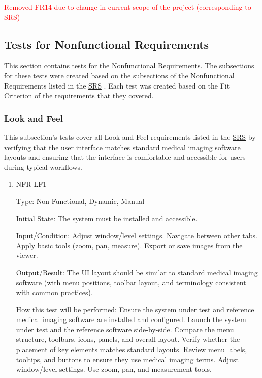 \documentclass[12pt, titlepage]{article}
\begin{document}
\begin{enumerate}
\begin{enumerate}
\begin{enumerate}
\textcolor{red}{Removed FR14 due to change in current scope of the project (corresponding to SRS)}

\subsection{Tests for Nonfunctional Requirements}

This section contains tests for the Nonfunctional Requirements. The subsections for these tests were created based on the subsections of the Nonfunctional Requirements listed in the \href{https://github.com/RezaJodeiri/CXR-Capstone/blob/main/docs/SRS/SRS.pdf}{SRS} \citep{SRS}
. Each test was created based on the Fit Criterion of the requirements that they covered.

\subsubsection{Look and Feel}

This subsection's tests cover all Look and Feel requirements listed in the \href{https://github.com/RezaJodeiri/CXR-Capstone/blob/main/docs/SRS/SRS.pdf}{SRS} \citep{SRS}
 by verifying that the user interface matches standard medical imaging software layouts and ensuring that the interface is comfortable and accessible for users during typical workflows.

\begin{enumerate}

\item{NFR-LF1\\}\label{NFR-LF1}

Type: Non-Functional, Dynamic, Manual

Initial State: The system must be installed and accessible.

Input/Condition: Adjust window/level settings. Navigate between other tabs. Apply basic tools (zoom, pan, measure). Export or save images from the viewer.

Output/Result: The UI layout should be similar to standard medical imaging software (with menu positions, toolbar layout, and terminology consistent with common practices).

How this test will be performed: Ensure the system under test and reference medical imaging software are installed and configured. Launch the system under test and the reference software side-by-side. Compare the menu structure, toolbars, icons, panels, and overall layout. Verify whether the placement of key elements matches standard layouts. Review menu labels, tooltips, and buttons to ensure they use medical imaging terms. Adjust window/level settings. Use zoom, pan, and measurement tools.


\end{enumerate}
\end{enumerate}
\end{enumerate}
\end{enumerate}
\end{document}
